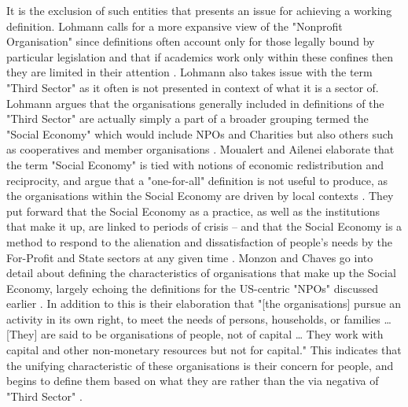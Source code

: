 It is the exclusion of such entities that presents an issue for achieving a working definition. Lohmann calls for a more expansive view of the "Nonprofit Organisation" since definitions often account only for those legally bound by particular legislation and that if academics work only within these confines then they are limited in their attention \cite{lohmann_charity_2007}. Lohmann also takes issue with the term "Third Sector" as it often is not presented in context of what it is a sector of. Lohmann argues that the organisations generally included in definitions of the "Third Sector" are actually simply a part of a broader grouping termed the "Social Economy" which would include NPOs and Charities but also others such as cooperatives and member organisations \cite{lohmann_charity_2007}. Moualert and Ailenei elaborate that the term "Social Economy" is tied with notions of economic redistribution and reciprocity, and argue that a "one-for-all" definition is not useful to produce, as the organisations within the Social Economy are driven by local contexts \cite{moulaert_social_2005}. They put forward that the Social Economy as a practice, as well as the institutions that make it up, are linked to periods of crisis -- and that the Social Economy is a method to respond to the alienation and dissatisfaction of people's needs by the For-Profit and State sectors at any given time \cite{moulaert_social_2005}. Monzon and Chaves go into detail about defining the characteristics of organisations that make up the Social Economy, largely echoing the definitions for the US-centric "NPOs" discussed earlier \cite{monzon_european_2008}. In addition to this is their elaboration that "[the organisations] pursue an activity in its own right, to meet the needs of persons, households, or families … [They] are said to be organisations of people, not of capital … They work with capital and other non-monetary resources but not for capital." This indicates that the unifying characteristic of these organisations is their concern for people, and begins to define them based on what they are rather than the via negativa of "Third Sector" \cite{monzon_european_2008}.


